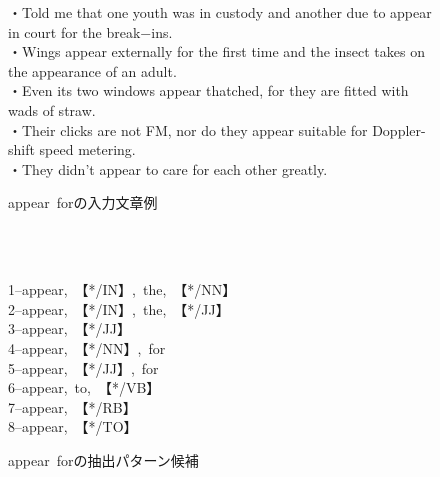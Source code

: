 \documentclass[12pt,twoside, fleqn]{ujbook}
\begin{document}
	\newpage
	\begin{figure}
	\begin{screen}
		・Told me that one youth was in custody and another due to appear in court for the break−ins.\\
		・Wings appear externally for the first time and the insect takes on the appearance of an adult.\\
		・Even its two windows appear thatched, for they are fitted with wads of straw.\\
		・Their clicks are not FM, nor do they appear suitable for Doppler-shift speed metering.\\
		・They didn't appear to care for each other greatly.
	\end{screen}
	\caption{appear\ forの入力文章例}
	\label{fig:appear_in}
	\end{figure}

	　\\
	　\\

	\begin{figure}[htbp]
	\begin{center}
	\begin{minipage}{0.5\hsize}
	\begin{center}
	\begin{shadebox}
		1--appear,\ 【*/IN】,\ the,\ 【*/NN】\\
		2--appear,\ 【*/IN】,\ the,\ 【*/JJ】\\
		3--appear,\ 【*/JJ】\\
		4--appear,\ 【*/NN】,\ for\\
		5--appear,\ 【*/JJ】,\ for\\
		6--appear,\ to,\ 【*/VB】\\
		7--appear,\ 【*/RB】\\
		8--appear,\ 【*/TO】
	\end{shadebox}
	\end{center}
	\end{minipage}
	\end{center}
	\caption{appear\ forの抽出パターン候補}
	\label{fig:appear_out}
	\end{figure}
\end{document}
